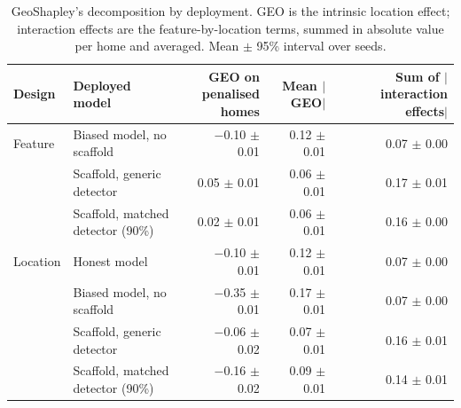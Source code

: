 \begin{table}[t]
\centering
\footnotesize
\setlength{\tabcolsep}{3.5pt}
\begin{adjustbox}{max width=\linewidth}
\begin{tabular}{llrrr}
\toprule
Design & \makecell[b]{Deployed \\ model} & \makecell[b]{GEO on \\ penalised \\ homes} & \makecell[b]{Mean \\ $|$GEO$|$} & \makecell[b]{Sum of \\ $|$interaction \\ effects$|$} \\
\midrule
Feature & Biased model, no scaffold & $-$0.10 $\pm$ 0.01 & 0.12 $\pm$ 0.01 & 0.07 $\pm$ 0.00 \\
 & Scaffold, generic detector & 0.05 $\pm$ 0.01 & 0.06 $\pm$ 0.01 & 0.17 $\pm$ 0.01 \\
 & Scaffold, matched detector (90\%) & 0.02 $\pm$ 0.01 & 0.06 $\pm$ 0.01 & 0.16 $\pm$ 0.00 \\
\midrule
Location & Honest model & $-$0.10 $\pm$ 0.01 & 0.12 $\pm$ 0.01 & 0.07 $\pm$ 0.00 \\
 & Biased model, no scaffold & $-$0.35 $\pm$ 0.01 & 0.17 $\pm$ 0.01 & 0.07 $\pm$ 0.00 \\
 & Scaffold, generic detector & $-$0.06 $\pm$ 0.02 & 0.07 $\pm$ 0.01 & 0.16 $\pm$ 0.01 \\
 & Scaffold, matched detector (90\%) & $-$0.16 $\pm$ 0.02 & 0.09 $\pm$ 0.01 & 0.14 $\pm$ 0.01 \\
\bottomrule
\end{tabular}
\end{adjustbox}
\caption{GeoShapley's decomposition by deployment. GEO is the intrinsic location effect; interaction effects are the feature-by-location terms, summed in absolute value per home and averaged. Mean $\pm$ 95\% interval over seeds.}
\label{tab:geo}
\end{table}

